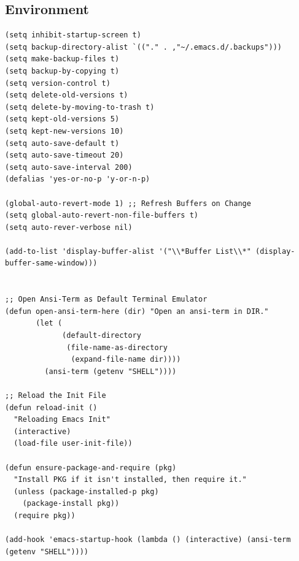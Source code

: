 \documentclass[11pt]{article}
\begin{document}
\subsection{Environment}
\label{sec:org2bc6a03}
\begin{verbatim}
(setq inhibit-startup-screen t)
(setq backup-directory-alist `(("." . ,"~/.emacs.d/.backups")))
(setq make-backup-files t)
(setq backup-by-copying t)
(setq version-control t)
(setq delete-old-versions t)
(setq delete-by-moving-to-trash t)
(setq kept-old-versions 5)
(setq kept-new-versions 10)
(setq auto-save-default t)
(setq auto-save-timeout 20)
(setq auto-save-interval 200)
(defalias 'yes-or-no-p 'y-or-n-p)

(global-auto-revert-mode 1) ;; Refresh Buffers on Change
(setq global-auto-revert-non-file-buffers t)
(setq auto-rever-verbose nil)

(add-to-list 'display-buffer-alist '("\\*Buffer List\\*" (display-buffer-same-window)))


;; Open Ansi-Term as Default Terminal Emulator
(defun open-ansi-term-here (dir) "Open an ansi-term in DIR."
       (let (
             (default-directory
              (file-name-as-directory
               (expand-file-name dir))))
         (ansi-term (getenv "SHELL")))) 

;; Reload the Init File
(defun reload-init ()
  "Reloading Emacs Init"
  (interactive)
  (load-file user-init-file))

(defun ensure-package-and-require (pkg)
  "Install PKG if it isn't installed, then require it."
  (unless (package-installed-p pkg)
    (package-install pkg))
  (require pkg))

(add-hook 'emacs-startup-hook (lambda () (interactive) (ansi-term (getenv "SHELL"))))
\end{verbatim}
\end{document}
